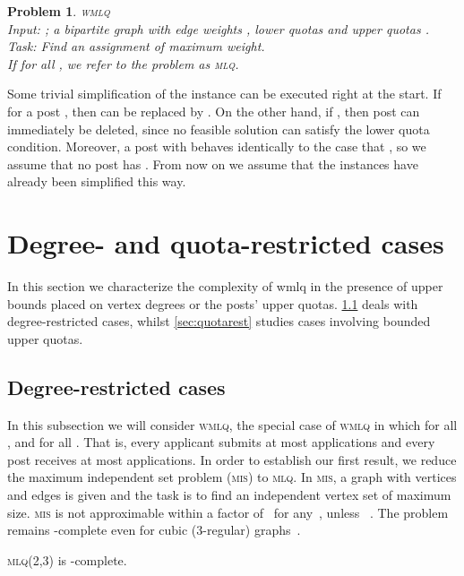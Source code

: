\documentclass{llncs}
\newtheorem{pr}[theorem]{Problem}
\begin{document}
\begin{pr}\textsc{wmlq}\ \\
	Input: ; a bipartite graph  with edge weights , lower quotas  and upper quotas .\\
Task: Find an assignment of maximum weight.\\
If  for all , we refer to the problem as \textsc{mlq}.
\label{pr:wmlq}
\end{pr}
 


Some trivial simplification of the instance can be executed right at the start. If  for a post , then  can be replaced by . On the other hand, if , then post  can immediately be deleted, since no feasible solution can satisfy the lower quota condition. Moreover, a post  with  behaves identically to the case that , so we assume that no post  has . From now on we assume that the instances have already been simplified this way.

\section{Degree- and quota-restricted cases}\label{sec:com_rest}
In this section we characterize the complexity of {\sc wmlq} in the presence of upper bounds placed on vertex degrees or the posts' upper quotas.  \cref{sec:degreerest} deals with degree-restricted cases, whilst \cref{sec:quotarest} studies cases involving bounded upper quotas.

\subsection{Degree-restricted cases}
\label{sec:degreerest}
In this subsection we will consider \textsc{wmlq}, the special case of \textsc{wmlq} in which  for all , and  for all . That is, every applicant submits at most  applications and every post receives at most  applications. In order to establish our first result, we reduce the maximum independent set problem (\textsc{mis}) to \textsc{mlq}. In \textsc{mis}, a graph with  vertices and  edges is given and the task is to find an independent vertex set of maximum size. 
\textsc{mis} is not approximable within a factor of~ for any~, unless ~\cite{Zuc07}. The problem remains -complete even for cubic (3-regular) graphs~\cite{AK00}.

\begin{theorem}
	\label{th:max_spa_np}
	\textsc{mlq(2,3)} is -complete.
\end{theorem}
\end{document}
